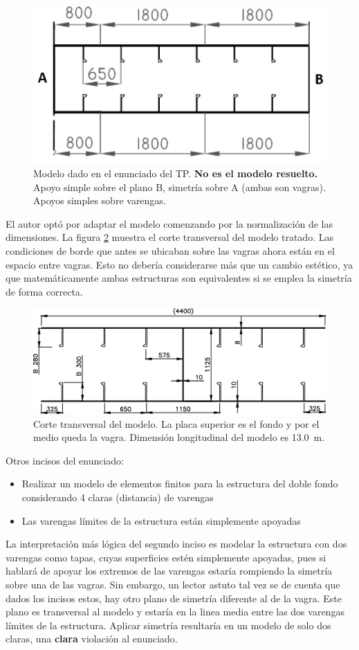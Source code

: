 \documentclass[onecolumn,10pt,titlepage]{article}
\begin{document}
\begin{figure}[htb!]
	\centering
	\includegraphics[width=.5\textwidth]{fig/modelocatedra.png}
	\caption{Modelo dado en el enunciado del TP. \textbf{No es el modelo resuelto.} Apoyo simple sobre el plano B, simetría sobre A (ambas son vagras). Apoyos simples sobre varengas.}
	\label{fig:modelocatedra}
\end{figure}
El autor optó por adaptar el modelo comenzando por la normalización de las dimensiones. La figura \ref{fig:modeloTransversal} muestra el corte transversal del modelo tratado. Las condiciones de borde que antes se ubicaban sobre las vagras ahora están en el espacio entre vagras. Esto no debería considerarse más que un cambio estético, ya que matemáticamente ambas estructuras son equivalentes si se emplea la simetría de forma correcta.
\begin{figure}[htb!]
	\centering
	\includegraphics[width=0.7\linewidth]{fig/MODELO.eps}
	\caption{Corte transversal del modelo. La placa superior es el fondo y por el medio queda la vagra. Dimensión longitudinal del modelo es \SI{13,0}{\meter}.}
	\label{fig:modeloTransversal}
\end{figure}

Otros incisos del enunciado:
\begin{itemize}
	\item Realizar un modelo de elementos finitos para la estructura del doble fondo considerando 4 claras (distancia) de varengas
	\item Las varengas límites de la estructura están simplemente apoyadas
\end{itemize}
La interpretación más lógica del segundo inciso es modelar la estructura con dos varengas como tapas, cuyas superficies estén simplemente apoyadas, pues si hablará de apoyar los extremos de las varengas estaría rompiendo la simetría sobre una de las vagras. Sin embargo, un lector astuto tal vez se de cuenta que dados los incisos estos, hay otro plano de simetría diferente al de la vagra. Este plano es transversal al modelo y estaría en la linea media entre las dos varengas límites de la estructura. Aplicar simetría resultaría en un modelo de solo dos claras, una \textbf{clara} violación al enunciado.
\end{document}
